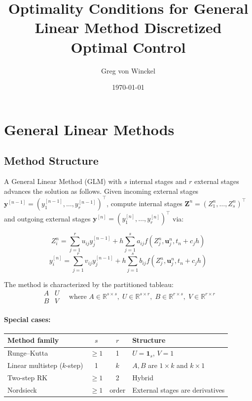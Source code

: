 \documentclass[11pt]{article}
\newcommand{\RR}{\mathbb{R}}
\newcommand{\tp}{^\top}
\newcommand{\Zv}{\mathbf{Z}}
\newcommand{\yv}{\mathbf{y}}
\newcommand{\uv}{\mathbf{u}}
\begin{document}
\title{Optimality Conditions for General Linear Method Discretized Optimal Control}
\date{\today}
\author{Greg von Winckel}
\maketitle

\section{General Linear Methods}

\subsection{Method Structure}

A General Linear Method (GLM) with $s$ internal stages and $r$ external stages advances the solution as follows. Given incoming external stages $\yv^{[n-1]} = (y_1^{[n-1]}, \ldots, y_r^{[n-1]})\tp$, compute internal stages $\Zv^n = (Z_1^n, \ldots, Z_s^n)\tp$ and outgoing external stages $\yv^{[n]} = (y_1^{[n]}, \ldots, y_r^{[n]})\tp$ via:

\begin{equation}
\label{eqn:glm_stages}
Z_i^n = \sum_{j=1}^r u_{ij} y_j^{[n-1]} + h \sum_{j=1}^s a_{ij} f(Z_j^n, \uv_j^n, t_n + c_j h)
\end{equation}
\begin{equation}
\label{eqn:glm_propagate}
y_i^{[n]} = \sum_{j=1}^r v_{ij} y_j^{[n-1]} + h \sum_{j=1}^s b_{ij} f(Z_j^n, \uv_j^n, t_n + c_j h)
\end{equation}

The method is characterized by the partitioned tableau:
\begin{equation}
\begin{array}{c|c}
A & U \\
\hline
B & V
\end{array}
\quad \text{where } A \in \RR^{s\times s}, \; U \in \RR^{s \times r}, \; B \in \RR^{r \times s}, \; V \in \RR^{r \times r}
\end{equation}

\paragraph{Special cases:}
\begin{center}
\begin{tabular}{l|cc|l}
Method family & $s$ & $r$ & Structure \\
\hline
Runge--Kutta & $\geq 1$ & 1 & $U = \mathbf{1}_s$, $V = 1$ \\
Linear multistep ($k$-step) & 1 & $k$ & $A, B$ are $1 \times k$ and $k \times 1$ \\
Two-step RK & $\geq 1$ & 2 & Hybrid \\
Nordsieck & $\geq 1$ & order & External stages are derivatives
\end{tabular}
\end{center}
\end{document}
